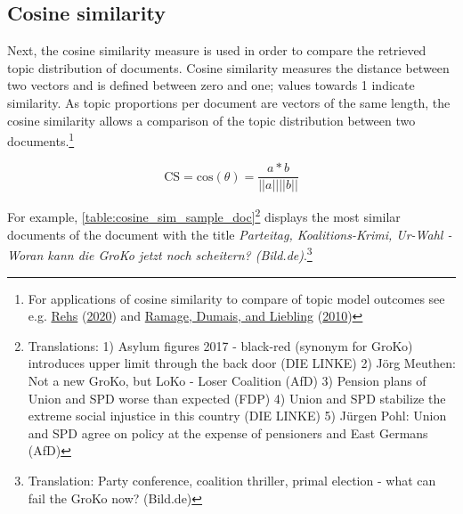 \documentclass[
]{article}
\begin{document}
\hypertarget{cosine-similarity}{%
\subsection{Cosine similarity}\label{cosine-similarity}}

Next, the cosine similarity measure is used in order to compare the
retrieved topic distribution of documents. Cosine similarity measures
the distance between two vectors and is defined between zero and one;
values towards 1 indicate similarity. As topic proportions per document
are vectors of the same length, the cosine similarity allows a
comparison of the topic distribution between two documents.\footnote{For
  applications of cosine similarity to compare of topic model outcomes
  see e.g. \protect\hyperlink{ref-rehs_structural_2020}{Rehs}
  (\protect\hyperlink{ref-rehs_structural_2020}{2020}) and
  \protect\hyperlink{ref-ramage_characterizing_2010}{Ramage, Dumais, and
  Liebling} (\protect\hyperlink{ref-ramage_characterizing_2010}{2010})}

\[
\text{CS} = \text{cos}(\theta)=\frac{a*b}{||a|| ||b||}
\]

For example, \autoref{table:cosine_sim_sample_doc}\footnote{Translations:
  1) Asylum figures 2017 - black-red (synonym for GroKo) introduces
  upper limit through the back door (DIE LINKE) 2) Jörg Meuthen: Not a
  new GroKo, but LoKo - Loser Coalition (AfD) 3) Pension plans of Union
  and SPD worse than expected (FDP) 4) Union and SPD stabilize the
  extreme social injustice in this country (DIE LINKE) 5) Jürgen Pohl:
  Union and SPD agree on policy at the expense of pensioners and East
  Germans (AfD)} displays the most similar documents of the document
with the title \emph{Parteitag, Koalitions-Krimi, Ur-Wahl - Woran kann
die GroKo jetzt noch scheitern? (Bild.de)}.\footnote{Translation: Party
  conference, coalition thriller, primal election - what can fail the
  GroKo now? (Bild.de)}
\end{document}
